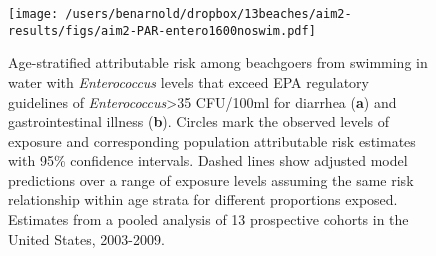 \documentclass[11pt]{article}
\begin{document}
\begin{figure}[htbp]
\begin{center}
\texttt{[image: /users/benarnold/dropbox/13beaches/aim2-results/figs/aim2-PAR-entero1600noswim.pdf]} 
\begin{minipage}{\textwidth}
\caption{Age-stratified attributable risk among beachgoers from swimming in water with \textit{Enterococcus} levels that exceed EPA regulatory guidelines of \textit{Enterococcus}>35 CFU/100ml for diarrhea (\textbf{a}) and gastrointestinal illness (\textbf{b}).  Circles mark the observed levels of exposure and corresponding population attributable risk estimates with 95\% confidence intervals. Dashed lines show adjusted model predictions over a range of exposure levels assuming the same risk relationship within age strata for different proportions exposed. Estimates from a pooled analysis of 13 prospective cohorts in the United States, 2003-2009.}
\label{fig:enteroPAR}
\end{minipage}
\end{center}
\end{figure}
\end{document}
